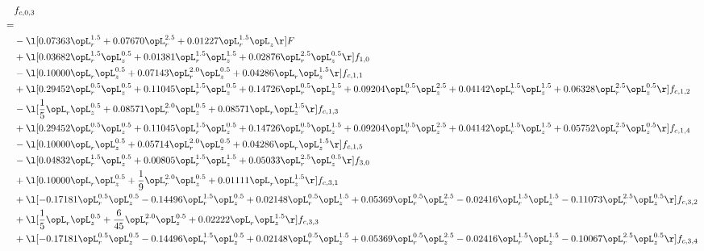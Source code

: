 \begin{alignat}{2} 
\label{eq:f_03_1} 
& f_{c,0,3} \nonumber \\ 
 = \\ 
& - \l[  0.07363 \opL_r^{1.5} +  0.07670 \opL_r^{2.5} +  0.01227 \opL_r^{1.5} \opL_z  \r] F \nonumber \\ 
& + \l[  0.03682 \opL_r^{1.5} \opL_z^{0.5} +  0.01381 \opL_r^{1.5} \opL_z^{1.5} +  0.02876 \opL_r^{2.5} \opL_z^{0.5}  \r] f_{1,0} \nonumber \\ 
& - \l[  0.10000 \opL_r \opL_z^{0.5} +  0.07143 \opL_r^{2.0} \opL_z^{0.5} +  0.04286 \opL_r \opL_z^{1.5}  \r] f_{c,1,1} \nonumber \\ 
& + \l[  0.29452 \opL_r^{0.5} \opL_z^{0.5} +  0.11045 \opL_r^{1.5} \opL_z^{0.5} +  0.14726 \opL_r^{0.5} \opL_z^{1.5} +  0.09204 \opL_r^{0.5} \opL_z^{2.5} +  0.04142 \opL_r^{1.5} \opL_z^{1.5} +  0.06328 \opL_r^{2.5} \opL_z^{0.5}  \r] f_{c,1,2} \nonumber \\ 
& - \l[ \frac{1}{5} \opL_r \opL_z^{0.5} +  0.08571 \opL_r^{2.0} \opL_z^{0.5} +  0.08571 \opL_r \opL_z^{1.5}  \r] f_{c,1,3} \nonumber \\ 
& + \l[  0.29452 \opL_r^{0.5} \opL_z^{0.5} +  0.11045 \opL_r^{1.5} \opL_z^{0.5} +  0.14726 \opL_r^{0.5} \opL_z^{1.5} +  0.09204 \opL_r^{0.5} \opL_z^{2.5} +  0.04142 \opL_r^{1.5} \opL_z^{1.5} +  0.05752 \opL_r^{2.5} \opL_z^{0.5}  \r] f_{c,1,4} \nonumber \\ 
& - \l[  0.10000 \opL_r \opL_z^{0.5} +  0.05714 \opL_r^{2.0} \opL_z^{0.5} +  0.04286 \opL_r \opL_z^{1.5}  \r] f_{c,1,5} \nonumber \\ 
& - \l[  0.04832 \opL_r^{1.5} \opL_z^{0.5} +  0.00805 \opL_r^{1.5} \opL_z^{1.5} +  0.05033 \opL_r^{2.5} \opL_z^{0.5}  \r] f_{3,0} \nonumber \\ 
& + \l[  0.10000 \opL_r \opL_z^{0.5} + \frac{1}{9} \opL_r^{2.0} \opL_z^{0.5} +  0.01111 \opL_r \opL_z^{1.5}  \r] f_{c,3,1} \nonumber \\ 
& + \l[  -0.17181 \opL_r^{0.5} \opL_z^{0.5}   -0.14496 \opL_r^{1.5} \opL_z^{0.5} +  0.02148 \opL_r^{0.5} \opL_z^{1.5} +  0.05369 \opL_r^{0.5} \opL_z^{2.5}   -0.02416 \opL_r^{1.5} \opL_z^{1.5}   -0.11073 \opL_r^{2.5} \opL_z^{0.5}  \r] f_{c,3,2} \nonumber \\ 
& + \l[ \frac{1}{5} \opL_r \opL_z^{0.5} + \frac{6}{45} \opL_r^{2.0} \opL_z^{0.5} +  0.02222 \opL_r \opL_z^{1.5}  \r] f_{c,3,3} \nonumber \\ 
& + \l[  -0.17181 \opL_r^{0.5} \opL_z^{0.5}   -0.14496 \opL_r^{1.5} \opL_z^{0.5} +  0.02148 \opL_r^{0.5} \opL_z^{1.5} +  0.05369 \opL_r^{0.5} \opL_z^{2.5}   -0.02416 \opL_r^{1.5} \opL_z^{1.5}   -0.10067 \opL_r^{2.5} \opL_z^{0.5}  \r] f_{c,3,4} \nonumber \\ 

\end{alignat}
